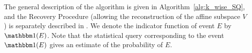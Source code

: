 	The general description of the algorithm is given in Algorithm~\ref{alg:k_wise_SQ}, and the Recovery Procedure (allowing the reconstruction of the affine subspace $V$) is separately described in . We denote the indicator function of event $E$ by $\ind(E)$. Note that the statistical query corresponding to the event $\ind(E)$ gives an estimate of the probability of $E$.
